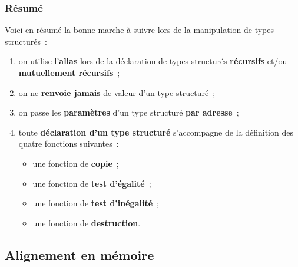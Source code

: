 \begin{frame}[fragile]
\frametitle{Résumé}
Voici en résumé la bonne marche à suivre lors de la manipulation de
types structurés~:
\smallskip

\begin{enumerate}
    \item on utilise l'{\bf alias} lors de la déclaration de types structurés
    {\bf récursifs} et/ou {\bf mutuellement récursifs}~;
    \bigskip

    \item on ne {\bf renvoie jamais} de valeur d'un type structuré~;
    \bigskip

    \item on passe les {\bf paramètres} d'un type structuré {\bf par adresse}~;
    \bigskip

    \item toute {\bf déclaration d'un type structuré} s'accompagne de la
    définition des quatre fonctions suivantes~:

    \begin{itemize} \normalsize
        \item une fonction de {\bf copie}~;
        \smallskip

        \item une fonction de {\bf test d'égalité}~;
        \smallskip

        \item une fonction de {\bf test d'inégalité}~;
        \smallskip

        \item une fonction de {\bf destruction}.
    \end{itemize}
\end{enumerate}
\end{frame}

\subsection{Alignement en mémoire}

